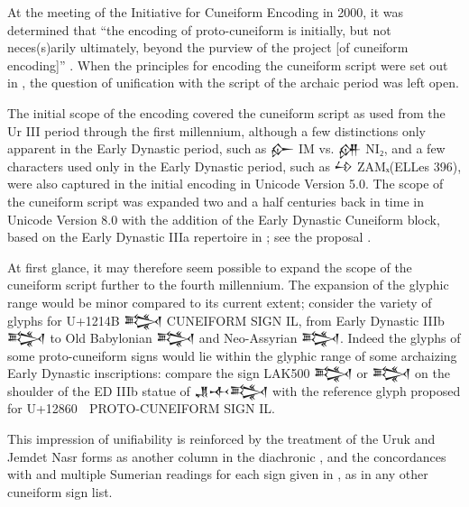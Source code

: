 ﻿At the meeting of the Initiative for Cuneiform Encoding in 2000, it
was determined that “the encoding of proto-cuneiform is initially, but
not neces(s)arily ultimately, beyond the purview of the project
[of cuneiform encoding]” \cite{L2/00-398}. When the principles for encoding
the cuneiform script were set out in \cite{L2/03-162}, the question of
unification with the script of the archaic period was left open.

The initial scope of the encoding covered the cuneiform script as used
from the Ur III period through the first millennium, although a few
distinctions only apparent in the Early Dynastic period, such as {\oraccnoto 𒅎} IM
vs. {\oraccnoto 𒉎} NI₂, and a few characters used only in the Early Dynastic
period, such as {\oraccnoto 𒍡} ZAMₓ(ELLes 396), were also captured in the initial
encoding in Unicode Version 5.0. The scope of the cuneiform script was
expanded two and a half centuries back in time in Unicode Version 8.0
with the addition of the Early Dynastic Cuneiform block, based on the
Early Dynastic IIIa repertoire in \cite{LAK}; see the
proposal \cite{L2/12-208}.

At first glance, it may therefore seem possible to expand the scope of
the cuneiform script further to the fourth millennium. The expansion
of the glyphic range would be minor compared to its current extent;
consider the variety of glyphs for U+1214B {\oraccnoto 𒅋} CUNEIFORM
SIGN IL, from Early Dynastic IIIb {\oraccrsp 𒅋} to Old Babylonian
{\oraccobf 𒅋} and Neo-Assyrian {\oraccnao 𒅋}. Indeed the glyphs of
some proto-cuneiform signs would lie within the glyphic range of some
archaizing Early Dynastic inscriptions: compare the sign LAK500
{\oracclak 𒅋} or {\oracclaksaltiii 𒅋} on the shoulder of the ED IIIb
statue of {\oraccnoto 𒂗𒋾𒅋} \cite{P225850} with the reference glyph
proposed for U+12860 {\oraccpc 𒡠} PROTO-CUNEIFORM SIGN IL.

%

This impression of unifiability is reinforced by the treatment of the
Uruk and Jemdet Nasr forms as another column in the
diachronic \cite{LabatMEA}, and the concordances with \cite{LAK} and
multiple Sumerian readings for each sign given
in \cite[167--346]{ATU2}, as in any other cuneiform sign list.


